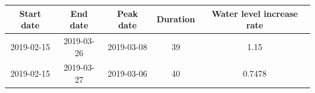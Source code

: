 \documentclass[12pt,]{article}
\begin{document}
\begin{longtable}[]{@{}ccccc@{}}
\toprule
\begin{minipage}[b]{0.14\columnwidth}\centering\strut
Start date\strut
\end{minipage} & \begin{minipage}[b]{0.14\columnwidth}\centering\strut
End date\strut
\end{minipage} & \begin{minipage}[b]{0.14\columnwidth}\centering\strut
Peak date\strut
\end{minipage} & \begin{minipage}[b]{0.12\columnwidth}\centering\strut
Duration\strut
\end{minipage} & \begin{minipage}[b]{0.30\columnwidth}\centering\strut
Water level increase rate\strut
\end{minipage}\tabularnewline
\midrule
\endhead
\begin{minipage}[t]{0.14\columnwidth}\centering\strut
2019-02-15\strut
\end{minipage} & \begin{minipage}[t]{0.14\columnwidth}\centering\strut
2019-03-26\strut
\end{minipage} & \begin{minipage}[t]{0.14\columnwidth}\centering\strut
2019-03-08\strut
\end{minipage} & \begin{minipage}[t]{0.12\columnwidth}\centering\strut
39\strut
\end{minipage} & \begin{minipage}[t]{0.30\columnwidth}\centering\strut
1.15\strut
\end{minipage}\tabularnewline
\begin{minipage}[t]{0.14\columnwidth}\centering\strut
2019-02-15\strut
\end{minipage} & \begin{minipage}[t]{0.14\columnwidth}\centering\strut
2019-03-27\strut
\end{minipage} & \begin{minipage}[t]{0.14\columnwidth}\centering\strut
2019-03-06\strut
\end{minipage} & \begin{minipage}[t]{0.12\columnwidth}\centering\strut
40\strut
\end{minipage} & \begin{minipage}[t]{0.30\columnwidth}\centering\strut
0.7478\strut
\end{minipage}\tabularnewline

\end{longtable}
\end{document}

